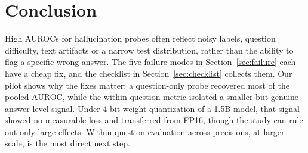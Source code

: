 \documentclass[conference]{IEEEtran}
\begin{document}
\section{Conclusion}
High AUROCs for hallucination probes often reflect noisy labels, question difficulty, text artifacts or a narrow test distribution, rather than the ability to flag a specific wrong answer. The five failure modes in Section~\ref{sec:failure} each have a cheap fix, and the checklist in Section~\ref{sec:checklist} collects them. Our pilot shows why the fixes matter: a question-only probe recovered most of the pooled AUROC, while the within-question metric isolated a smaller but genuine answer-level signal. Under 4-bit weight quantization of a 1.5B model, that signal showed no measurable loss and transferred from FP16, though the study can rule out only large effects. Within-question evaluation across precisions, at larger scale, is the most direct next step.

\FloatBarrier


\end{document}
